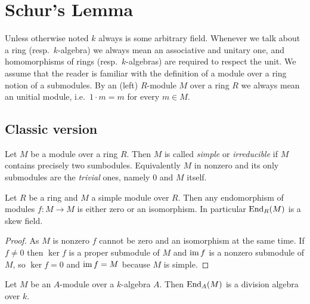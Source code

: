 \chapter{Schur’s Lemma}
Unless otherwise noted $k$ always is some arbitrary field. Whenever we talk about a ring (resp.\ $k$-algebra) we always mean an associative and unitary one, and homomorphisms of rings (resp.\ $k$-algebras) are required to respect the unit. We assume that the reader is familiar with the definition of a module over a ring notion of a submodules. By an (left) $R$-module $M$ over a ring $R$ we always mean an unitial module, i.e.\ $1 \cdot m = m$ for every $m \in M$.





\section{Classic version}


\begin{defi}
 Let $M$ be a module over a ring $R$. Then $M$ is called \emph{simple} or \emph{irreducible} if $M$ contains precisely two sumbodules. Equivalently $M$ in nonzero and its only submodules are the \emph{trivial} ones, namely $0$ and $M$ itself.
\end{defi}


\begin{lem}[Schur]
 Let $R$ be a ring and $M$ a simple module over $R$. Then any endomorphism of modules $f \colon M \to M$ is either zero or an isomorphism. In particular $\operatorname{End}_R(M)$ is a skew field.
\end{lem}
\begin{proof}
 As $M$ is nonzero $f$ cannot be zero and an isomorphism at the same time. If $f \neq 0$ then $\ker f$ is a proper submodule of $M$ and $\operatorname{im} f$ is a nonzero submodule of $M$, so $\ker f = 0$ and $\operatorname{im} f = M$ because $M$ is simple.
\end{proof}


\begin{cor}
 Let $M$ be an $A$-module over a $k$-algebra $A$. Then $\operatorname{End}_A(M)$ is a division algebra over $k$.
\end{cor}


